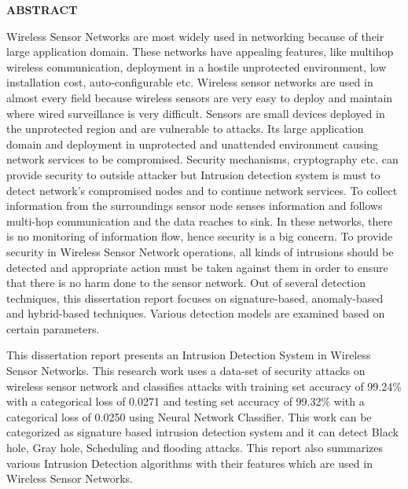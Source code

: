 \vspace{4.0\baselineskip}
\textbf{\hspace{4.cm}
		\LARGE \textbf{ABSTRACT}}

\vspace{15mm}
	 	 	
Wireless Sensor Networks are most widely used in networking because of their large application domain. These networks have appealing features, like multihop wireless communication, deployment in a hostile unprotected environment, low installation cost, auto-configurable etc. Wireless sensor networks are used in almost every field because wireless sensors are very easy to deploy and maintain where wired surveillance is very difficult. Sensors are small devices deployed in the unprotected region and are vulnerable to attacks. Its large application domain and deployment in unprotected and unattended environment causing network services to be compromised. Security mechanisms, cryptography etc. can provide security to outside attacker but Intrusion detection system is must to detect network’s compromised nodes and to continue network services. To collect information from the surroundings sensor node senses information and follows multi-hop communication and the data reaches to sink. In these networks, there is no monitoring of information flow, hence security is a big concern. To provide security in Wireless Sensor Network operations, all kinds of intrusions should be detected and appropriate action must be taken against them in order to ensure that there is no harm done to the sensor network. Out of several detection techniques, this dissertation report focuses on signature-based, anomaly-based and hybrid-based techniques. Various detection models are examined based on certain parameters.
\par
This dissertation report presents an Intrusion Detection System in Wireless Sensor Networks. This research work uses a data-set of security attacks on wireless sensor network and classifies attacks with training set accuracy of 99.24\% with a categorical loss of 0.0271 and testing set accuracy of 99.32\% with a categorical loss of 0.0250 using Neural Network Classifier. This work can be categorized as signature based intrusion detection system and it can detect Black hole, Gray hole, Scheduling and flooding attacks. This report also summarizes various Intrusion Detection algorithms with their features which are used in Wireless Sensor Networks.
